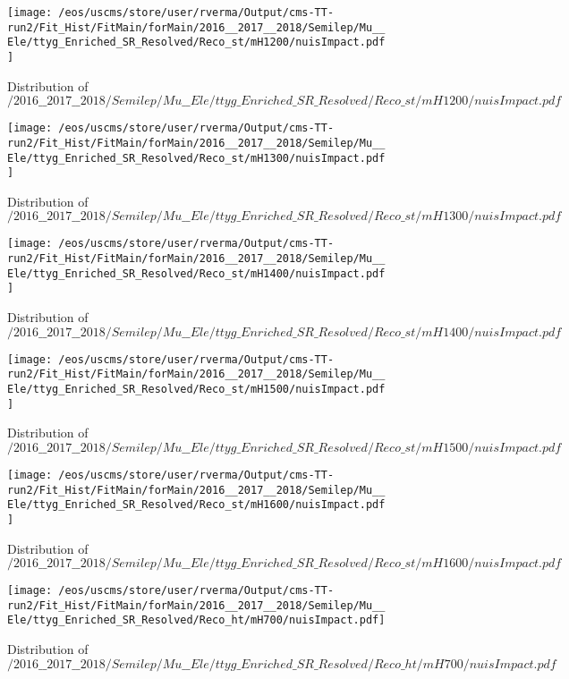 \begin{figure}
\centering
\texttt{[image: /eos/uscms/store/user/rverma/Output/cms-TT-run2/Fit\_Hist/FitMain/forMain/2016\_\_2017\_\_2018/Semilep/Mu\_\_Ele/ttyg\_Enriched\_SR\_Resolved/Reco\_st/mH1200/nuisImpact.pdf]}
\caption{Distribution of $/2016\_\_2017\_\_2018/Semilep/Mu\_\_Ele/ttyg\_Enriched\_SR\_Resolved/Reco\_st/mH1200/nuisImpact.pdf$}
\end{figure}

\begin{figure}
\centering
\texttt{[image: /eos/uscms/store/user/rverma/Output/cms-TT-run2/Fit\_Hist/FitMain/forMain/2016\_\_2017\_\_2018/Semilep/Mu\_\_Ele/ttyg\_Enriched\_SR\_Resolved/Reco\_st/mH1300/nuisImpact.pdf]}
\caption{Distribution of $/2016\_\_2017\_\_2018/Semilep/Mu\_\_Ele/ttyg\_Enriched\_SR\_Resolved/Reco\_st/mH1300/nuisImpact.pdf$}
\end{figure}

\begin{figure}
\centering
\texttt{[image: /eos/uscms/store/user/rverma/Output/cms-TT-run2/Fit\_Hist/FitMain/forMain/2016\_\_2017\_\_2018/Semilep/Mu\_\_Ele/ttyg\_Enriched\_SR\_Resolved/Reco\_st/mH1400/nuisImpact.pdf]}
\caption{Distribution of $/2016\_\_2017\_\_2018/Semilep/Mu\_\_Ele/ttyg\_Enriched\_SR\_Resolved/Reco\_st/mH1400/nuisImpact.pdf$}
\end{figure}

\begin{figure}
\centering
\texttt{[image: /eos/uscms/store/user/rverma/Output/cms-TT-run2/Fit\_Hist/FitMain/forMain/2016\_\_2017\_\_2018/Semilep/Mu\_\_Ele/ttyg\_Enriched\_SR\_Resolved/Reco\_st/mH1500/nuisImpact.pdf]}
\caption{Distribution of $/2016\_\_2017\_\_2018/Semilep/Mu\_\_Ele/ttyg\_Enriched\_SR\_Resolved/Reco\_st/mH1500/nuisImpact.pdf$}
\end{figure}

\begin{figure}
\centering
\texttt{[image: /eos/uscms/store/user/rverma/Output/cms-TT-run2/Fit\_Hist/FitMain/forMain/2016\_\_2017\_\_2018/Semilep/Mu\_\_Ele/ttyg\_Enriched\_SR\_Resolved/Reco\_st/mH1600/nuisImpact.pdf]}
\caption{Distribution of $/2016\_\_2017\_\_2018/Semilep/Mu\_\_Ele/ttyg\_Enriched\_SR\_Resolved/Reco\_st/mH1600/nuisImpact.pdf$}
\end{figure}

\begin{figure}
\centering
\texttt{[image: /eos/uscms/store/user/rverma/Output/cms-TT-run2/Fit\_Hist/FitMain/forMain/2016\_\_2017\_\_2018/Semilep/Mu\_\_Ele/ttyg\_Enriched\_SR\_Resolved/Reco\_ht/mH700/nuisImpact.pdf]}
\caption{Distribution of $/2016\_\_2017\_\_2018/Semilep/Mu\_\_Ele/ttyg\_Enriched\_SR\_Resolved/Reco\_ht/mH700/nuisImpact.pdf$}
\end{figure}

